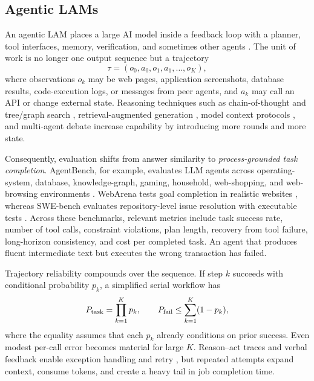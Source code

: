\documentclass[letterpaper,journal]{IEEEtran}
\begin{document}
\subsection{Agentic LAMs}
An agentic LAM places a large AI model inside a feedback loop with a planner,
tool interfaces, memory, verification, and sometimes other agents
\cite{react,reflexion,du_debate}. The unit of work is no longer one output
sequence but a trajectory
\[
\tau=(o_0,a_0,o_1,a_1,\ldots,o_K),
\]
where observations $o_k$ may be web pages, application screenshots, database
results, code-execution logs, or messages from peer agents, and $a_k$ may call
an API or change external state. Reasoning techniques such as chain-of-thought
\cite{cot} and tree/graph search \cite{tot}, retrieval-augmented generation
\cite{rag}, model context protocols \cite{agentprotocols}, and multi-agent
debate \cite{du_debate} increase capability by introducing more rounds and
more state.

Consequently, evaluation shifts from answer similarity to
\emph{process-grounded task completion}. AgentBench, for example, evaluates
LLM agents across operating-system, database, knowledge-graph, gaming,
household, web-shopping, and web-browsing environments
\cite{agentbench}. WebArena tests goal completion in realistic websites
\cite{webarena}, whereas SWE-bench evaluates repository-level issue resolution
with executable tests \cite{swebench}. Across these benchmarks, relevant
metrics include task success rate, number of tool calls, constraint violations,
plan length, recovery from tool failure, long-horizon consistency, and cost per
completed task. An agent that produces fluent intermediate text but executes
the wrong transaction has failed.

Trajectory reliability compounds over the sequence. If step $k$ succeeds with
conditional probability $p_k$, a simplified serial workflow has
\begin{equation}
P_{\rm task}=\prod_{k=1}^{K}p_k,\qquad
P_{\rm fail}\leq\sum_{k=1}^{K}(1-p_k),
\label{eq:agent_reliability}
\end{equation}
where the equality assumes that each $p_k$ already conditions on prior
success. Even modest per-call error becomes material for large $K$.
Reason--act traces and verbal feedback enable exception handling and retry
\cite{react,reflexion}, but repeated attempts expand context, consume tokens,
and create a heavy tail in job completion time. 
\end{document}

